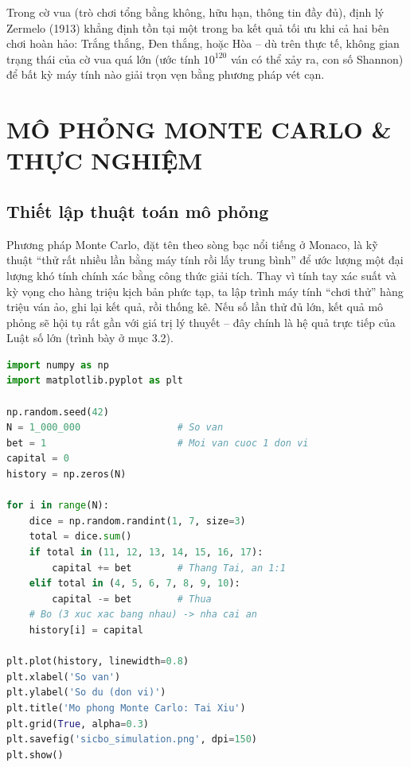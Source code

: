 \documentclass[12pt,a4paper]{article}
\theoremstyle{coloredthm}
\theoremstyle{coloreddef}
\theoremstyle{remark}
\begin{document}
Trong cờ vua (trò chơi tổng bằng không, hữu hạn, thông tin đầy đủ), định lý Zermelo (1913) khẳng định tồn tại một trong ba kết quả tối ưu khi cả hai bên chơi hoàn hảo: Trắng thắng, Đen thắng, hoặc Hòa -- dù trên thực tế, không gian trạng thái của cờ vua quá lớn (ước tính $10^{120}$ ván có thể xảy ra, con số Shannon) để bất kỳ máy tính nào giải trọn vẹn bằng phương pháp vét cạn.

\section{MÔ PHỎNG MONTE CARLO \& THỰC NGHIỆM}

\subsection{Thiết lập thuật toán mô phỏng}

\begin{giaithich}
Phương pháp Monte Carlo, đặt tên theo sòng bạc nổi tiếng ở Monaco, là kỹ thuật ``thử rất nhiều lần bằng máy tính rồi lấy trung bình'' để ước lượng một đại lượng khó tính chính xác bằng công thức giải tích. Thay vì tính tay xác suất và kỳ vọng cho hàng triệu kịch bản phức tạp, ta lập trình máy tính ``chơi thử'' hàng triệu ván ảo, ghi lại kết quả, rồi thống kê. Nếu số lần thử đủ lớn, kết quả mô phỏng sẽ hội tụ rất gần với giá trị lý thuyết -- đây chính là hệ quả trực tiếp của Luật số lớn (trình bày ở mục 3.2).
\end{giaithich}

\begin{lstlisting}[language=Python, caption={Mô phỏng Monte Carlo trò Tài Xỉu}, label={lst:sicbo}]
import numpy as np
import matplotlib.pyplot as plt

np.random.seed(42)
N = 1_000_000                 # So van
bet = 1                       # Moi van cuoc 1 don vi
capital = 0
history = np.zeros(N)

for i in range(N):
    dice = np.random.randint(1, 7, size=3)
    total = dice.sum()
    if total in (11, 12, 13, 14, 15, 16, 17):
        capital += bet        # Thang Tai, an 1:1
    elif total in (4, 5, 6, 7, 8, 9, 10):
        capital -= bet        # Thua
    # Bo (3 xuc xac bang nhau) -> nha cai an
    history[i] = capital

plt.plot(history, linewidth=0.8)
plt.xlabel('So van')
plt.ylabel('So du (don vi)')
plt.title('Mo phong Monte Carlo: Tai Xiu')
plt.grid(True, alpha=0.3)
plt.savefig('sicbo_simulation.png', dpi=150)
plt.show()
\end{lstlisting}
\end{document}
